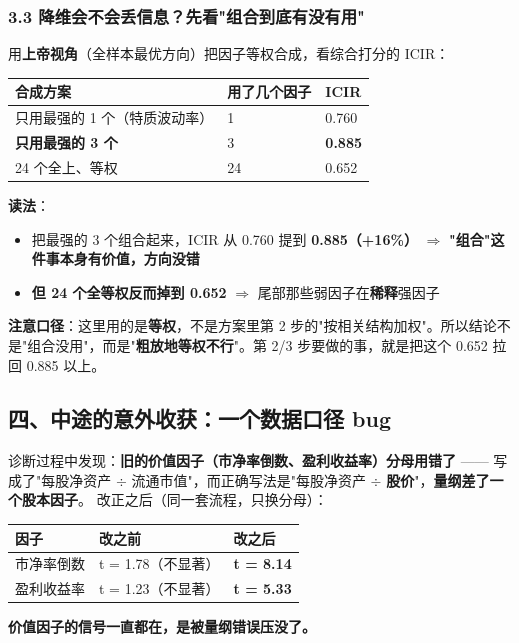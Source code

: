 \documentclass[11pt]{article}
\begin{document}
\subsubsection{\texorpdfstring{3.3 降维会不会丢信息？先看"组合到底有没有用"}{3.3 降维会不会丢信息？先看"组合到底有没有用"}}
用\textbf{上帝视角}（全样本最优方向）把因子等权合成，看综合打分的 ICIR：
{\small
\begin{longtable}{p{9.40cm}p{3.89cm}p{2.92cm}}
\toprule
合成方案 & 用了几个因子 & ICIR \\
\midrule
只用最强的 1 个（特质波动率） & 1 & 0.760 \\
\textbf{只用最强的 3 个} & 3 & \textbf{0.885} \\
24 个全上、等权 & 24 & 0.652 \\
\bottomrule
\end{longtable}
}
\textbf{读法}：
\begin{itemize}
  \item 把最强的 3 个组合起来，ICIR 从 0.760 提到 \textbf{0.885（+16\%）} \ensuremath{\Longrightarrow} \textbf{"组合"这件事本身有价值，方向没错}
  \item \textbf{但 24 个全等权反而掉到 0.652} \ensuremath{\Longrightarrow} 尾部那些弱因子在\textbf{稀释}强因子
\end{itemize}
\textbf{注意口径}：这里用的是\textbf{等权}，不是方案里第 2 步的"按相关结构加权"。所以结论不是"组合没用"，而是"\textbf{粗放地等权不行}"。第 2/3 步要做的事，就是把这个 0.652 拉回 0.885 以上。
\subsection{\texorpdfstring{四、中途的意外收获：一个数据口径 bug}{四、中途的意外收获：一个数据口径 bug}}
诊断过程中发现：\textbf{旧的价值因子（市净率倒数、盈利收益率）分母用错了} ------ 写成了"每股净资产 \ensuremath{\div} 流通市值"，而正确写法是"每股净资产 \ensuremath{\div} \textbf{股价}"，\textbf{量纲差了一个股本因子}。
改正之后（同一套流程，只换分母）：
{\small
\begin{longtable}{p{4.05cm}p{7.29cm}p{4.86cm}}
\toprule
因子 & 改之前 & 改之后 \\
\midrule
市净率倒数 & t = 1.78（不显著） & \textbf{t = 8.14} \\
盈利收益率 & t = 1.23（不显著） & \textbf{t = 5.33} \\
\bottomrule
\end{longtable}
}
\textbf{价值因子的信号一直都在，是被量纲错误压没了。}
\end{document}
